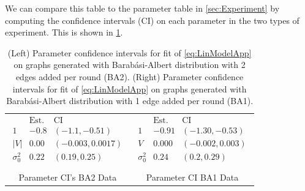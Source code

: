 \documentclass[aps,superscriptaddress,floatfix,amsmath,amssymb]{revtex4-2}
\begin{document}
We can compare this table to the parameter table in \cref{sec:Experiment} by computing the confidence intervals (CI) on each parameter in the two types of experiment. This is shown in \cref{tab:Comparison}.
\begin{table}[htbp]
\begin{tabular}{cc}
\begin{minipage}{0.45\textwidth}
\begin{displaymath}
\begin{array}{l|cc}
 \text{} & \text{Est.}  & \text{CI} \\
\hline
 1 & -0.8  & (-1.1,-0.51) \\
 |V| & 0.00 & (-0.003,0.0017) \\
 \sigma_0^2  & 0.22  & (0.19,0.25) \\
\end{array}
\end{displaymath}
\end{minipage} & 
\begin{minipage}{0.45\textwidth}
\begin{displaymath}
\begin{array}{l|cc}
 \text{} & \text{Est.}  & \text{CI} \\
\hline
 1 & -0.91  & (-1.30,-0.53) \\
 V & 0.000  & (-0.002,0.003) \\
 \sigma_0^2  & 0.24  & (0.2,0.29) \\
\end{array}
\end{displaymath}
\end{minipage}\\
Parameter CI's BA2 Data & Parameter CI BA1 Data
\end{tabular}
\caption{(Left) Parameter confidence intervals for fit of \cref{eq:LinModelApp} on graphs generated with Barab\'{a}si-Albert distribution with 2 edges added per round (BA2). (Right)  Parameter confidence intervals for fit of \cref{eq:LinModelApp} on graphs generated with Barab\'{a}si-Albert distribution with 1 edge added per round (BA1).}
\label{tab:Comparison}
\end{table}
\end{document}
